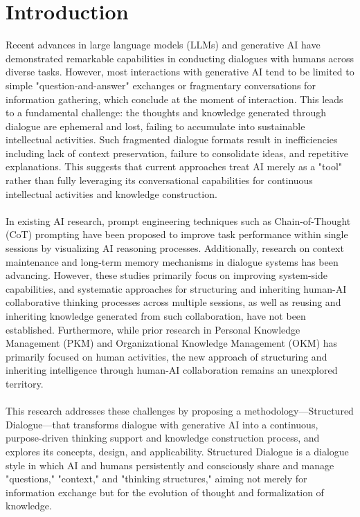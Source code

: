 \documentclass[11pt]{article}
\begin{document}
\section{Introduction}
Recent advances in large language models (LLMs) and generative AI have demonstrated remarkable capabilities in conducting dialogues with humans across diverse tasks. However, most interactions with generative AI tend to be limited to simple "question-and-answer" exchanges or fragmentary conversations for information gathering, which conclude at the moment of interaction. This leads to a fundamental challenge: the thoughts and knowledge generated through dialogue are ephemeral and lost, failing to accumulate into sustainable intellectual activities. Such fragmented dialogue formats result in inefficiencies including lack of context preservation, failure to consolidate ideas, and repetitive explanations. This suggests that current approaches treat AI merely as a "tool" rather than fully leveraging its conversational capabilities for continuous intellectual activities and knowledge construction. \\
\\
In existing AI research, prompt engineering techniques such as Chain-of-Thought (CoT) prompting \cite{ref3} have been proposed to improve task performance within single sessions by visualizing AI reasoning processes. Additionally, research on context maintenance and long-term memory mechanisms in dialogue systems \cite{ref7} has been advancing. However, these studies primarily focus on improving system-side capabilities, and systematic approaches for structuring and inheriting human-AI collaborative thinking processes across multiple sessions, as well as reusing and inheriting knowledge generated from such collaboration, have not been established. Furthermore, while prior research in Personal Knowledge Management (PKM) and Organizational Knowledge Management (OKM) \cite{ref9} has primarily focused on human activities, the new approach of structuring and inheriting intelligence through human-AI collaboration remains an unexplored territory. \\
\\
This research addresses these challenges by proposing a methodology—Structured Dialogue—that transforms dialogue with generative AI into a continuous, purpose-driven thinking support and knowledge construction process, and explores its concepts, design, and applicability. Structured Dialogue is a dialogue style in which AI and humans persistently and consciously share and manage "questions," "context," and "thinking structures," aiming not merely for information exchange but for the evolution of thought and formalization of knowledge. \\
\end{document}
